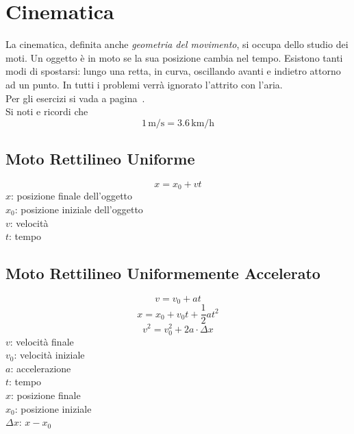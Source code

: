 
\section{Cinematica}\label{sec:cinematica}
La cinematica, definita anche \emph{geometria del movimento}, si occupa dello studio dei moti. Un 
oggetto è in moto se la sua posizione cambia nel tempo. Esistono tanti modi di spostarsi: lungo una
retta, in curva, oscillando avanti e indietro attorno ad un punto. In tutti i problemi verrà 
ignorato l'attrito con l'aria.\\
Per gli esercizi si vada a pagina~\pageref{ex:cinematica}.\\[\baselineskip]
Si noti e ricordi che
\begin{equation*}
1\,\text{m/s} = 3.6\,\text{km/h}
\end{equation*}

\subsection{Moto Rettilineo Uniforme}\label{subsec:cinematica:mru}
\begin{equation*}
x = x_0 + vt
\end{equation*}
$x$: posizione finale dell'oggetto\\
$x_0$: posizione iniziale dell'oggetto\\
$v$: velocità\\
$t$: tempo

\subsection{Moto Rettilineo Uniformemente Accelerato}
\begin{equation*}
v = v_0 + at
\end{equation*}
\begin{equation*}
x = x_0 + v_0t + \frac{1}{2}at^2
\end{equation*}
\begin{equation*}
v^2 = v_0^2 + 2a\cdot\Delta x
\end{equation*}
$v$: velocità finale\\
$v_0$: velocità iniziale\\
$a$: accelerazione\\
$t$: tempo\\
$x$: posizione finale\\
$x_0$: posizione iniziale\\
$\Delta x$: $x - x_0$
